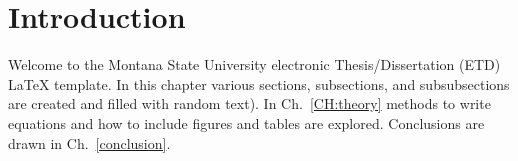 \chapter{Introduction}\label{CH:introduction}
Welcome to the Montana State University electronic Thesis/Dissertation (ETD) \LaTeX{} template.  In this chapter various sections, subsections, and subsubsections are created and filled with random text).  In Ch.~\ref{CH:theory} methods to write equations and how to include figures and tables are explored. Conclusions are drawn in Ch.~\ref{conclusion}.



